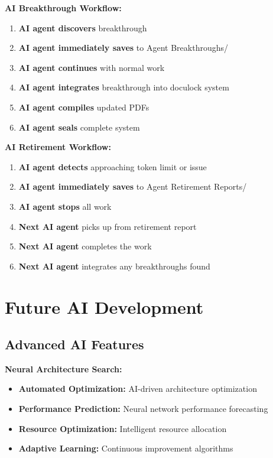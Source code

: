 \documentclass[12pt,a4paper]{article}
\begin{document}
\textbf{AI Breakthrough Workflow:}
\begin{enumerate}
    \item \textbf{AI agent discovers} breakthrough
    \item \textbf{AI agent immediately saves} to Agent Breakthroughs/
    \item \textbf{AI agent continues} with normal work
    \item \textbf{AI agent integrates} breakthrough into doculock system
    \item \textbf{AI agent compiles} updated PDFs
    \item \textbf{AI agent seals} complete system
\end{enumerate}

\textbf{AI Retirement Workflow:}
\begin{enumerate}
    \item \textbf{AI agent detects} approaching token limit or issue
    \item \textbf{AI agent immediately saves} to Agent Retirement Reports/
    \item \textbf{AI agent stops} all work
    \item \textbf{Next AI agent} picks up from retirement report
    \item \textbf{Next AI agent} completes the work
    \item \textbf{Next AI agent} integrates any breakthroughs found
\end{enumerate}

\section{Future AI Development}

\subsection{Advanced AI Features}

\textbf{Neural Architecture Search:}
\begin{itemize}
    \item \textbf{Automated Optimization:} AI-driven architecture optimization
    \item \textbf{Performance Prediction:} Neural network performance forecasting
    \item \textbf{Resource Optimization:} Intelligent resource allocation
    \item \textbf{Adaptive Learning:} Continuous improvement algorithms
\end{itemize}
\end{document}
